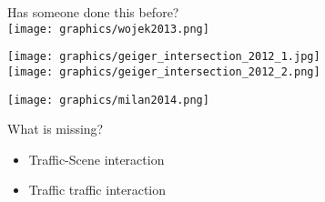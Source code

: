 
\begin{frame}{Has someone done this before?}
  \cite{Wojek_etal_2013} \\
  \texttt{[image: graphics/wojek2013.png]}
    
\end{frame}

\begin{frame}{\cite{Geiger_etal_2012} }
  \texttt{[image: graphics/geiger\_intersection\_2012\_1.jpg]}\\
  \texttt{[image: graphics/geiger\_intersection\_2012\_2.png]}
    
\end{frame}

\begin{frame}{ \cite{Milan_etal_2014}}
  \texttt{[image: graphics/milan2014.png]}
    
\end{frame}

\begin{frame}{What is missing?}
  \begin{itemize}
    \item Traffic-Scene interaction
    \item Traffic traffic interaction
  \end{itemize}
\end{frame}

